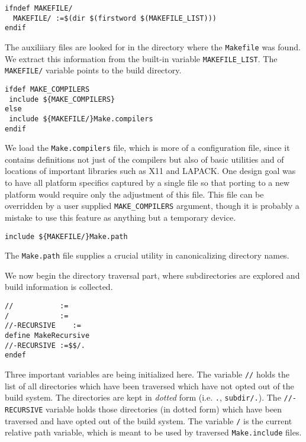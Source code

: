 \documentclass[letterpaper]{article}
\begin{document}
\begin{verbatim}
ifndef MAKEFILE/
  MAKEFILE/ :=$(dir $(firstword $(MAKEFILE_LIST)))
endif
\end{verbatim}
The auxiliiary files are looked for in the directory where the
\verb+Makefile+ was found.  We extract this information from the
built-in variable \verb+MAKEFILE_LIST+.  The \verb+MAKEFILE/+ variable
points to the build directory.

\begin{verbatim}
ifdef MAKE_COMPILERS
 include ${MAKE_COMPILERS}
else
 include ${MAKEFILE/}Make.compilers
endif
\end{verbatim}
We load the \verb+Make.compilers+ file, which is more of a
configuration file, since it contains definitions not just of the
compilers but also of basic utilities and of locations of important
libraries such as X11 and LAPACK.  One design goal was to have
all platform specifics captured by a single file so
that porting to a new platform would require only the adjustment
of this file.  This file can be overridden by a user supplied
\verb+MAKE_COMPILERS+ argument, though it is probably a mistake
to use this feature as anything but a temporary device.

\begin{verbatim}
include ${MAKEFILE/}Make.path
\end{verbatim}
The \verb+Make.path+ file supplies a crucial utility in canonicalizing
directory names.

We now begin the directory traversal part, where subdirectories are
explored and build information is collected.

\begin{verbatim}
//           :=
/            :=
//-RECURSIVE    :=
define MakeRecursive
//-RECURSIVE :=$$/.
endef
\end{verbatim}
Three important variables are being initialized here.  The variable
\verb+//+ holds the list of all directories which have been traversed
which have not opted out of the build system.  The directories are
kept in {\em dotted} form (i.e. \verb+.+, \verb+subdir/.+).  The
\verb+//-RECURSIVE+ variable holds those directories (in dotted form)
which have been traversed and have opted out of the build system.  The
variable \verb+/+ is the current relative path variable, which is
meant to be used by traversed \verb+Make.include+ files.
\end{document}
